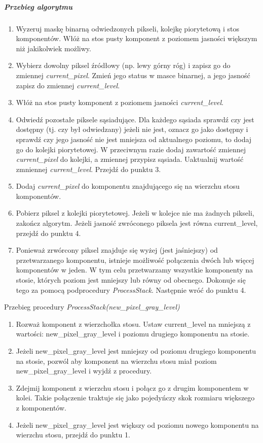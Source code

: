 \subparagraph{Przebieg algorytmu}

\begin{enumerate} \item Wyzeruj maskę binarną odwiedzonych pikseli, kolejkę
piorytetową i stos komponentów. Włóż na stos pusty komponent z poziomem
jasności większym niż jakikolwiek możliwy. \item Wybierz dowolny piksel
źródłowy (np. lewy górny róg) i zapisz go do zmiennej \textit{current\_pixel}.
Zmień jego status w masce binarnej, a jego jasność zapisz do zmiennej
\textit{current\_level}. \item Włóż na stos pusty komponent z poziomem jasności
\textit{current\_level}. \item Odwiedź pozostałe piksele sąsiadujące. Dla
każdego sąsiada sprawdź czy jest dostępny (tj. czy był odwiedzany) jeżeli nie
jest, oznacz go jako dostępny i sprawdź czy jego jasność nie jest mniejsza od
aktualnego poziomu, to dodaj go do kolejki piorytetowej. W przeciwnym razie
dodaj zawartość zmiennej \textit{current\_pixel} do kolejki, a zmiennej
przypisz sąsiada. Uaktualnij wartość zmniennej \textit{current\_level}. Przejdź
do punktu 3. \item Dodaj \textit{current\_pixel} do komponentu znajdującego się
na wierzchu stosu komponentów. \item Pobierz piksel z kolejki piorytetowej.
Jeżeli w kolejce nie ma żadnych pikseli, zakończ algorytm. Jeżeli jasność
zwróconego piksela jest równa current\_level, przejdź do punktu 4. \item
Ponieważ zrwórcony piksel znajduje się wyżej (jest jaśniejszy) od
przetwarzanego komponentu, istnieje możliwość połączenia dwóch lub więcej
komponentów w jeden. W tym celu przetwarzamy wszystkie komponenty na stosie,
których poziom jest mniejszy lub równy od obecnego. Dokonuje się tego za pomocą
podprocedury \textit{ProcessStack}. Następnie wróć do punktu 4. \end{enumerate}

Przebieg procedury \textit{ProcessStack(new\_pixel\_gray\_level)}
\begin{enumerate} \item Rozważ komponent z wierzchołka stosu. Ustaw
current\_level na mniejszą z wartości: new\_pixel\_gray\_level i poziomu
drugiego komponentu na stosie. \item Jeżeli new\_pixel\_gray\_level jest
mniejszy od poziomu drugiego komponentu na stosie, pozwól aby komponent na
wierzchu stosu miał poziom new\_pixel\_gray\_level i wyjdź z procedury. \item
Zdejmij komponent z wierzchu stosu i połącz go z drugim komponentem w kolei.
Takie połączenie traktuje się jako pojedyńczy skok rozmiaru większego z komponentów.
\item Jeżeli new\_pixel\_gray\_level jest większy od poziomu nowego komponentu
na wierzchu stosu, przejdź do punktu 1. \end{enumerate}

